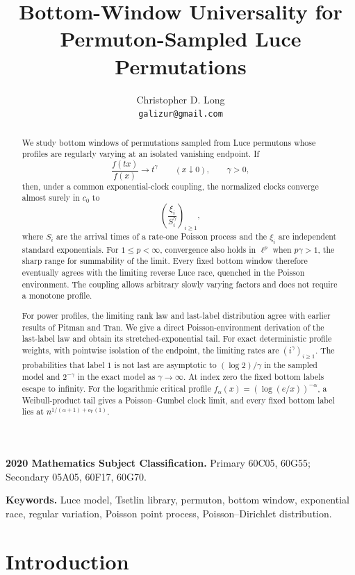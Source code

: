 \documentclass[11pt]{article}
\title{Bottom-Window Universality for Permuton-Sampled Luce Permutations}
\author{Christopher D. Long\\\texttt{galizur@gmail.com}}
\date{}
\numberwithin{equation}{section}
\theoremstyle{definition}
\theoremstyle{remark}
\newcommand{\Pp}{\mathbb P}
\begin{document}
\maketitle

\begin{abstract}
We study bottom windows of permutations sampled from Luce permutons whose profiles are regularly varying at an isolated vanishing endpoint.  If
\[
  \frac{f(tx)}{f(x)}\longrightarrow t^\gamma
  \qquad (x\downarrow0),
  \qquad \gamma>0,
\]
then, under a common exponential-clock coupling, the normalized clocks converge almost surely in $c_0$ to
\[
  \left(\frac{\xi_i}{S_i^\gamma}\right)_{i\geq1},
\]
where $S_i$ are the arrival times of a rate-one Poisson process and the $\xi_i$ are independent standard exponentials.  For $1\leq p<\infty$, convergence also holds in $\ell^p$ when $p\gamma>1$, the sharp range for summability of the limit.  Every fixed bottom window therefore eventually agrees with the limiting reverse Luce race, quenched in the Poisson environment.  The coupling allows arbitrary slowly varying factors and does not require a monotone profile.

For power profiles, the limiting rank law and last-label distribution agree with earlier results of Pitman and Tran.  We give a direct Poisson-environment derivation of the last-label law and obtain its stretched-exponential tail.  For exact deterministic profile weights, with pointwise isolation of the endpoint, the limiting rates are $(i^\gamma)_{i\geq1}$.  The probabilities that label $1$ is not last are asymptotic to $(\log2)/\gamma$ in the sampled model and $2^{-\gamma}$ in the exact model as $\gamma\to\infty$.  At index zero the fixed bottom labels escape to infinity.  For the logarithmic critical profile $f_\alpha(x)=(\log(e/x))^{-\alpha}$, a Weibull-product tail gives a Poisson--Gumbel clock limit, and every fixed bottom label lies at $n^{1/(\alpha+1)+o_{\Pp}(1)}$.
\end{abstract}

\medskip
\noindent\textbf{2020 Mathematics Subject Classification.}
Primary 60C05, 60G55; Secondary 05A05, 60F17, 60G70.

\smallskip
\noindent\textbf{Keywords.}
Luce model, Tsetlin library, permuton, bottom window, exponential race, regular variation, Poisson point process, Poisson--Dirichlet distribution.

\section{Introduction}
\end{document}
